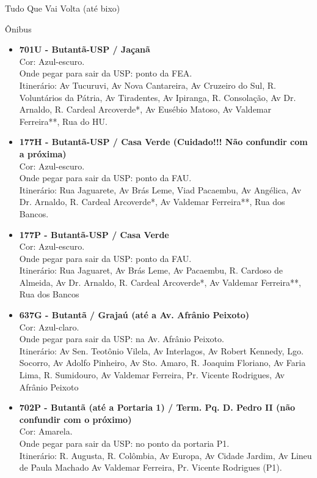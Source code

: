 \begin{secao}{Tudo Que Vai Volta (até bixo)}
\begin{subsecao}{Ônibus}
\begin{itemize}
  \item {\bf 701U - Butantã-USP / Jaçanã}\\
    Cor: Azul-escuro.\\
    Onde pegar para sair da USP: ponto da FEA.\\
    Itinerário: Av Tucuruvi, Av Nova Cantareira, Av Cruzeiro do Sul, R. Voluntários da
    Pátria, Av Tiradentes, Av Ipiranga, R. Consolação, Av Dr. Arnaldo, R.
    Cardeal Arcoverde*, Av Eusébio Matoso, Av Valdemar Ferreira**, Rua do HU.

  \item {\bf 177H  - Butantã-USP / Casa Verde (Cuidado!!! Não confundir com a próxima)}\\
    Cor: Azul-escuro.\\
    Onde pegar para sair da USP: ponto da FAU.\\
    Itinerário: Rua Jaguarete, Av Brás Leme, Viad Pacaembu, Av Angélica, Av Dr. Arnaldo,
	R. Cardeal Arcoverde*, Av Valdemar Ferreira**, Rua dos Bancos.

  \item {\bf 177P - Butantã-USP / Casa Verde}\\
    Cor: Azul-escuro.\\
    Onde pegar para sair da USP: ponto da FAU.\\
    Itinerário: Rua Jaguaret, Av Brás Leme, Av Pacaembu, R. Cardoso de Almeida, Av
    Dr. Arnaldo, R. Cardeal Arcoverde*, Av Valdemar Ferreira**, Rua dos Bancos
    
  \item {\bf 637G - Butantã / Grajaú (até a Av. Afrânio Peixoto)}\\
    Cor: Azul-claro.\\
    Onde pegar para sair da USP: na Av. Afrânio Peixoto.\\
    Itinerário: Av Sen. Teotônio Vilela, Av Interlagos, Av Robert Kennedy, Lgo. Socorro, Av
    Adolfo Pinheiro, Av Sto. Amaro, R. Joaquim Floriano, Av Faria Lima, R.
    Sumidouro, Av Valdemar Ferreira, Pr. Vicente Rodrigues, Av Afrânio Peixoto

  \item {\bf 702P - Butantã (até a Portaria 1) / Term. Pq. D. Pedro II (não confundir com
      o próximo)}\\
    Cor: Amarela.\\
    Onde pegar para sair da USP: no ponto da portaria P1.\\
    Itinerário: R. Augusta, R. Colômbia, Av Europa, Av Cidade Jardim, Av Lineu de Paula
    Machado Av Valdemar Ferreira, Pr. Vicente Rodrigues (P1).


\end{itemize}
\end{subsecao}
\end{secao}
